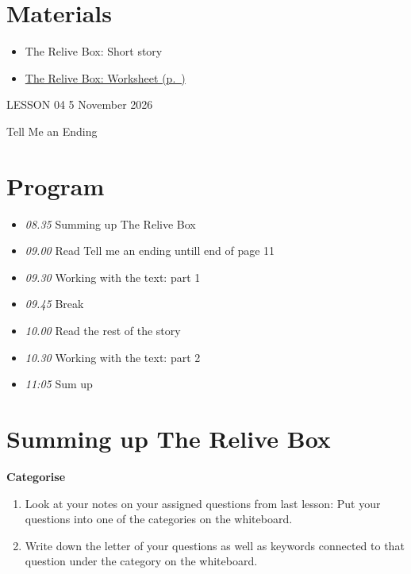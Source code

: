 \documentclass[11pt,a4paper,oneside]{book}
\newcommand{\tasktitle}[1]{{\color{blue}\bfseries #1}\par\smallskip}
\begin{document}
\section*{Materials}

\begin{itemize}
\item The Relive Box: Short story
\item \hyperref[worksheet-3]{The Relive Box: Worksheet (p.~\pageref*{worksheet-3})}
\end{itemize}

\clearpage{}
{\color{blue}\small LESSON 04 \hfill 5 November 2026\par}
\vspace{4mm}
{\displayfont\color{navy}\fontsize{30}{34}\selectfont Tell Me an Ending\par}\vspace{4mm}

\section*{Program}

\begin{itemize}
\item \emph{08.35} Summing up The Relive Box
\item \emph{09.00} Read Tell me an ending untill end of page 11
\item \emph{09.30} Working with the text: part 1
\item \emph{09.45} Break
\item \emph{10.00} Read the rest of the story
\item \emph{10.30} Working with the text: part 2
\item \emph{11:05} Sum up
\end{itemize}

\section*{Summing up The Relive Box}
\begin{taskbox}
\tasktitle{Categorise}
\begin{enumerate}
\item Look at your notes on your assigned questions from last lesson: Put your questions into one of the categories on the whiteboard.
\item Write down the letter of your questions as well as keywords connected to that question under the category on the whiteboard.
\end{enumerate}
\end{taskbox}
\end{document}
